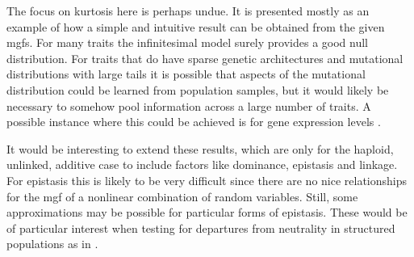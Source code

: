 \documentclass{article}
\begin{document}
The focus on kurtosis here is perhaps undue. It is presented mostly as an
example of how a simple and intuitive result can be obtained from the given
mgfs. For many traits the infinitesimal model surely provides a good null
distribution. For traits that do have sparse genetic architectures and
mutational distributions with large tails it is possible that aspects of the
mutational distribution could be learned from population samples, but it would
likely be necessary to somehow pool information across a large number of traits.
A possible instance where this could be achieved is for gene expression levels
\citep{Wheeler2016}.

It would be interesting to extend these results, which are only for the haploid,
unlinked, additive case to include factors like dominance, epistasis and
linkage. For epistasis this is likely to be very difficult since there are no
nice relationships for the mgf of a nonlinear combination of random variables.
Still, some approximations may be possible for particular forms of epistasis.
These would be of particular interest when testing for departures from
neutrality in structured populations as in \citet{Ovaskainen2011}.

 

\clearpage
\appendix
\end{document}
